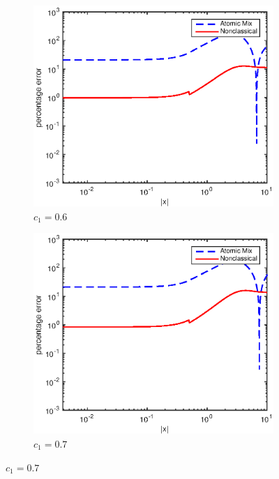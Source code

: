 \documentclass[12pt]{article}
\begin{document}
{\begin{figure}[p]
    \centering
    \begin{subfigure}{0.495\textwidth}
        \centering
        \includegraphics[width=\textwidth]{NSE_err_D60.eps}
        \caption{$c_1 = 0.6$}
        \label{figerrD60}
    \end{subfigure}
    \hfill
    \begin{subfigure}{0.495\textwidth}
        \centering
        \includegraphics[width=\textwidth]{NSE_err_D70.eps}
        \caption{$c_1 = 0.7$}

\end{subfigure}
\end{figure}}
\end{document}
